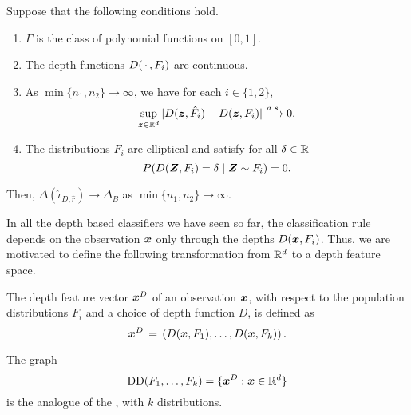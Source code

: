 \begin{lemma}
    Suppose that the following conditions hold.
    \vspace{-1em}
    \begin{enumerate}[itemsep = -0.2em]
        \item $\Gamma$ is the class of polynomial functions on $[0, 1]$.
        \item The depth functions $D(\,\cdot\,, F_i)$ are continuous.
        \item As $\min\{n_1, n_2\} \to \infty$, we have for each $i \in \{1, 2\}$,
        \begin{equation}
            \sup_{\bm{z} \in \mathbb{R}^d} |D(\bm{z}, \hat{F}_i) - D(\bm{z}, F_i)| \overset{a.s.\,}{\longrightarrow} 0.
        \end{equation}
        \item The distributions $F_i$ are elliptical and satisfy for all
        $\delta \in \mathbb{R}$
        \begin{equation}
            P(D(\bm{Z}, F_i) = \delta \mid \bm{Z} \sim F_i) = 0.
        \end{equation}
    \end{enumerate}
    Then, $\Delta(\hat{\iota}_{D, \hat{r}}) \to \Delta_B$ as $\min\{n_1, n_2\}
    \to \infty$.
\end{lemma}

In all the depth based classifiers we have seen so far, the classification
rule depends on the observation $\bm{x}$ only through the depths $D(\bm{x}, F_i)$.
Thus, we are motivated to define the following transformation from $\mathbb{R}^d$ to a
depth feature space.

\begin{definition}
    The depth feature vector $\bm{x}^D$ of an observation $\bm{x}$, with respect to
    the population distributions $F_i$ and a choice of depth function $D$, is
    defined as
    \begin{equation}
        \bm{x}^D \,=\, \left(D(\bm{x}, F_1), \dots, D(\bm{x}, F_k)\right).
    \end{equation}
\end{definition}
\begin{remark}
    The graph
    \begin{equation}
        \operatorname{DD}(F_1, \dots, F_k) = \{\bm{x}^D : \bm{x} \in \mathbb{R}^d\}
    \end{equation}
    is the analogue of the , with $k$ distributions.
\end{remark}

